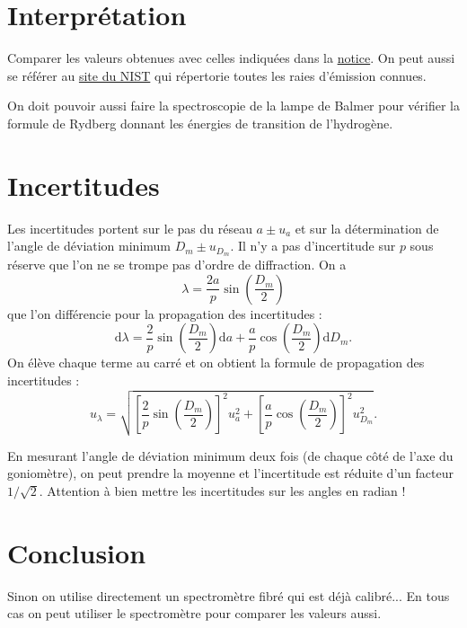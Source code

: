 \documentclass[12pt,a4paper]{article}
\renewcommand{\d}{\mathrm{d}}
\begin{document}
\section{Interprétation}

Comparer les valeurs obtenues avec celles indiquées dans la \href{https://agreg.phys.ens.fr/notices/N0102.pdf}{notice}.
On peut aussi se référer au \href{https://physics.nist.gov/PhysRefData/ASD/lines_form.html}{site du NIST} qui répertorie toutes les raies d'émission connues.

On doit pouvoir aussi faire la spectroscopie de la lampe de Balmer pour vérifier la formule de Rydberg donnant les énergies de transition de l'hydrogène.

\section{Incertitudes}

Les incertitudes portent sur le pas du réseau $a \pm u_a$ et sur la détermination de l'angle de déviation minimum $D_m \pm u_{D_m}$.
Il n'y a pas d'incertitude sur $p$ sous réserve que l'on ne se trompe pas d'ordre de diffraction.
On a 
\begin{equation}
\lambda = \frac{2a}{p} \sin\left(\frac{D_m}{2}\right)
\end{equation}
que l'on différencie pour la propagation des incertitudes :
\begin{equation}
\d \lambda = \frac{2}{p} \sin\left(\frac{D_m}{2}\right) \d a + \frac{a}{p} \cos\left(\frac{D_m}{2}\right) \d D_m.
\end{equation}
On élève chaque terme au carré et on obtient la formule de propagation des incertitudes :
\begin{equation}
u_\lambda = \sqrt{ \left[\frac{2}{p} \sin\left(\frac{D_m}{2}\right)\right]^2 u_a^2 + \left[\frac{a}{p} \cos\left(\frac{D_m}{2}\right)\right]^2 u_{D_m}^2 }.
\end{equation}

En mesurant l'angle de déviation minimum deux fois (de chaque côté de l'axe du goniomètre), on peut prendre la moyenne et l'incertitude est réduite d'un facteur $1/\sqrt{2}$.
Attention à bien mettre les incertitudes sur les angles en radian !

\section*{Conclusion}

Sinon on utilise directement un spectromètre fibré qui est déjà calibré...
En tous cas on peut utiliser le spectromètre pour comparer les valeurs aussi.
\end{document}
